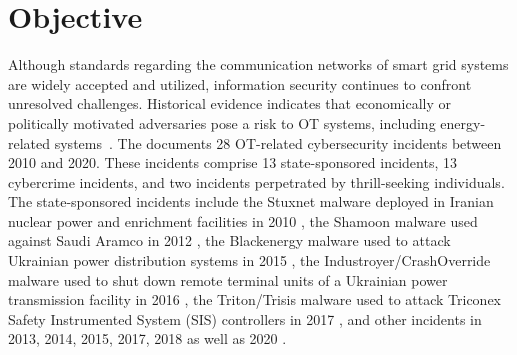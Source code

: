 \section{Objective}
\label{sec:introduction:objective}
Although standards regarding the communication networks of smart grid systems are widely accepted and utilized, information security continues to confront unresolved challenges.
Historical evidence indicates that economically or politically motivated adversaries pose a risk to OT systems, including energy-related systems~\cite{canada2021}.
The \citeauthor{canada2021} documents 28 OT-related cybersecurity incidents between 2010 and 2020.
These incidents comprise 13 state-sponsored incidents, 13 cybercrime incidents, and two incidents perpetrated by thrill-seeking individuals.
The state-sponsored incidents include the Stuxnet malware deployed in Iranian nuclear power and enrichment facilities in 2010 \cite{bbc2010}, the Shamoon malware used against Saudi Aramco in 2012 \cite{reuters2012}, the Blackenergy malware used to attack Ukrainian power distribution systems in 2015 \cite{cisa2021a}, the Industroyer/CrashOverride malware used to shut down remote terminal units of a Ukrainian power transmission facility in 2016 \cite{reuters2016,cisa2021b}, the Triton/Trisis malware used to attack Triconex Safety Instrumented System (SIS) controllers in 2017 \cite{johnson2017}, and other incidents in 2013, 2014, 2015, 2017, 2018 as well as 2020 \cite{wsj2015,cisa2018a,bsi2014,hdn2017,vice2017,cisa2018b,toi2020,warrick2020}.

